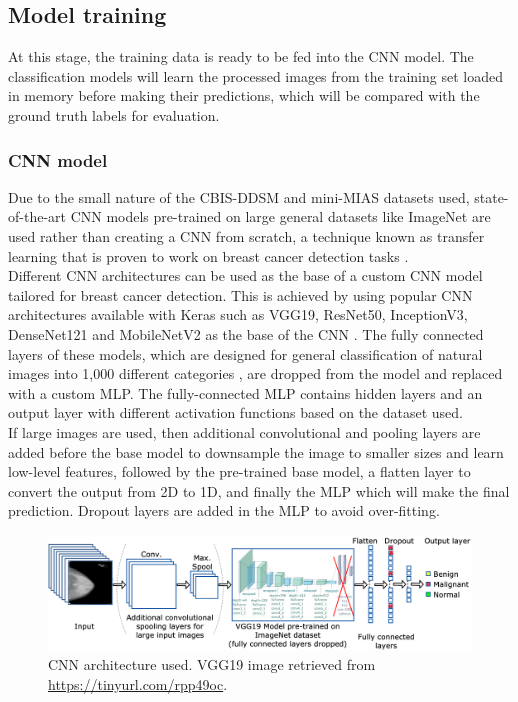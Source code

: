 


\subsection{Model training}

At this stage, the training data is ready to be fed into the CNN model. The classification models will learn the processed images from the training set loaded in memory before making their predictions, which will be compared with the ground truth labels for evaluation.

\subsubsection{CNN model}
\label{sec:design-cnn-model-decision}

Due to the small nature of the CBIS-DDSM and mini-MIAS datasets used, state-of-the-art CNN models pre-trained on large general datasets like ImageNet are used rather than creating a CNN from scratch, a technique known as transfer learning that is proven to work on breast cancer detection tasks \citep{Shen2017, Falconi2019}.\\

Different CNN architectures can be used as the base of a custom CNN model tailored for breast cancer detection. This is achieved by using popular CNN architectures available with Keras such as VGG19, ResNet50, InceptionV3, DenseNet121 and MobileNetV2 as the base of the CNN \citep{kerasApplications}. The fully connected layers of these models, which are designed for general classification of natural images into 1,000 different categories \citep{Krizhevsky2012}, are dropped from the model and replaced with a custom MLP. The fully-connected MLP contains hidden layers and an output layer with different activation functions based on the dataset used.\\

If large images are used, then additional convolutional and pooling layers are added before the base model to downsample the image to smaller sizes and learn low-level features, followed by the pre-trained base model, a flatten layer to convert the output from 2D to 1D, and finally the MLP which will make the final prediction. Dropout layers are added in the MLP to avoid over-fitting.

\begin{figure}[ht]
\centerline{\includegraphics[width=1.2\textwidth]{figures/design/CNN architecture.png}}
\caption{\label{fig:design-CNN architecture}CNN architecture used. VGG19 image retrieved from \url{https://tinyurl.com/rpp49oc}.}
\end{figure}

